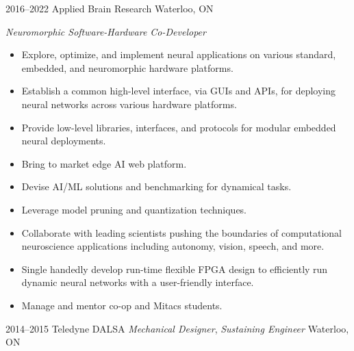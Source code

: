 \documentclass[a4paper,nocolors]{cv-friggeri-ben}
\begin{document}
\begin{entrylist}
\vspace{4pt}
\entry
    {2016--2022}
    {Applied Brain Research}
    {Waterloo, ON}
    {\emph{Neuromorphic Software-Hardware Co-Developer}
    \begin{itemize}
        \item Explore, optimize, and implement neural applications on various
            standard, embedded, and neuromorphic hardware platforms.
        \item Establish a common high-level interface, via GUIs and APIs, for
            deploying neural networks across various hardware platforms.
        \item Provide low-level libraries, interfaces, and protocols for
            modular embedded neural deployments.
        \item Bring to market edge AI web platform.
        \item Devise AI/ML solutions and benchmarking for dynamical tasks.
        \item Leverage model pruning and quantization techniques.
        \item Collaborate with leading scientists pushing the boundaries of
            computational neuroscience applications including autonomy, vision,
            speech, and more.
        \item Single handedly develop run-time flexible FPGA design to
            efficiently run dynamic neural networks with a user-friendly
            interface.
        \item Manage and mentor co-op and Mitacs students.
    \end{itemize}}

\vspace{-12pt}
\entry
    {2014--2015}
    {Teledyne DALSA
        {\normalfont \emph{Mechanical Designer}, \emph{Sustaining Engineer}}
    }
    {Waterloo, ON}{}


\end{entrylist}
\end{document}
